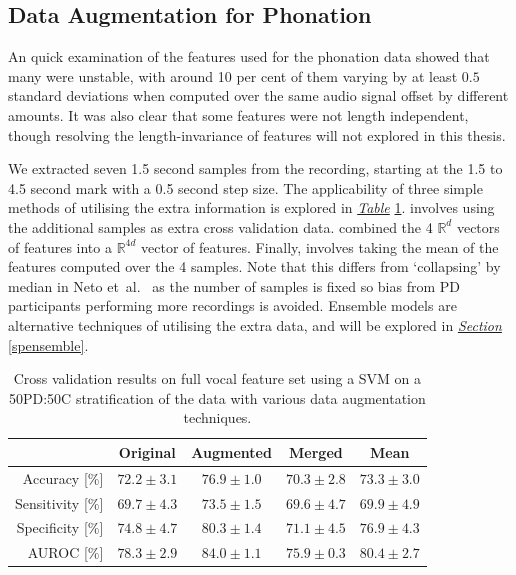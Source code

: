 \documentclass[12pt, twoside]{book}
\renewcommand\emph[1]{\textit{\color{USred}{#1}}}
\begin{document}
\subsection{Data Augmentation for Phonation}
An quick examination of the features used for the phonation data showed that many were unstable, with around 10 per cent of them varying by at least $0.5$ standard deviations when computed over the same audio signal offset by different amounts. It was also clear that some features were not length independent, though resolving the length-invariance of features will not explored in this thesis.

We extracted seven 1.5 second samples from the recording, starting at the 1.5 to 4.5 second mark with a 0.5 second step size. The applicability of three simple methods of utilising the extra information is explored in \textit{\hyperref[speechboost]{Table}} \ref{speechboost}. \emph{Augmentation} involves using the additional samples as extra cross validation data. \emph{Merging} combined the 4 $\mathbb{R}^d$ vectors of features into a $\mathbb{R}^{4d}$ vector of features. Finally, \emph{Meanify} involves taking the mean of the features computed over the 4 samples. Note that this differs from `collapsing' by median in Neto et~al.~\cite{mpowerneto2017analysis} as the number of samples is fixed so bias from PD participants performing more recordings is avoided. Ensemble models are alternative techniques of utilising the extra data, and will be explored in \textit{\hyperref[spensemble]{Section}} \ref{spensemble}. 




\begin{table}[!htb]
	\caption{Cross validation results on full vocal feature set using a SVM on a 50PD:50C stratification of the data with various data augmentation techniques.}
	\label{speechboost}
	\centering
	\begin{tabular}{@{}rcccc@{}}
		&  Original & Augmented & Merged & Mean \\ \midrule
		Accuracy [\%]    &      $72.2\pm3.1$ &                       $76.9\pm1.0$                                  &     		$70.3\pm2.8$
		&						$73.3\pm3.0$\\ \midrule
		Sensitivity [\%] &       $69.7\pm4.3$ &                       $73.5\pm1.5$                                  &    		$69.6\pm4.7$
		&					    $69.9\pm4.9$\\ \midrule
		Specificity [\%] &      $74.8\pm4.7$ &                       $80.3\pm1.4$                                  &    		$71.1\pm4.5$
		&					    $76.9\pm4.3$\\ \midrule
		AUROC [\%]         &      $78.3\pm2.9$ &                       $84.0\pm1.1$                                  &     		$75.9\pm0.3$
		&				 		$80.4\pm2.7$\\ \midrule
	\end{tabular}
\end{table}
\end{document}
